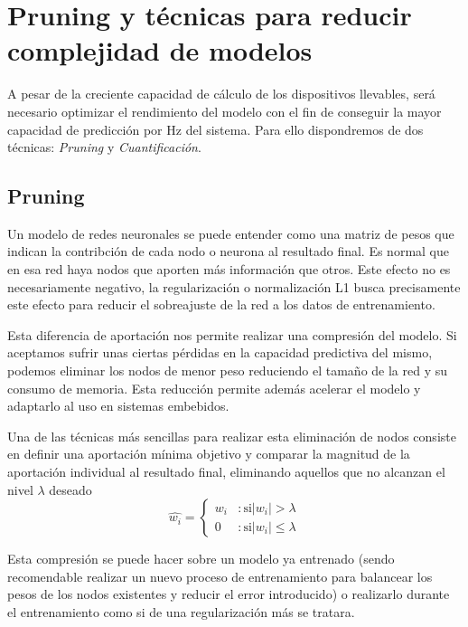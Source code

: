 \documentclass[../tfm.tex]{subfiles}
\begin{document}
\section{Pruning y técnicas para reducir complejidad de modelos}\label{sa_optimizacion}

A pesar de la creciente capacidad de cálculo de los dispositivos llevables, será necesario optimizar el rendimiento del modelo con el fin de conseguir la mayor capacidad de predicción por Hz del sistema. Para ello dispondremos de dos técnicas: \textit{Pruning} y \textit{Cuantificación}.

\subsection{Pruning}
Un modelo de redes neuronales se puede entender como una matriz de pesos que indican la contribción de cada nodo o neurona al resultado final. Es normal que en esa red haya nodos que aporten más información que otros. Este efecto no es necesariamente negativo, la regularización o normalización L1 busca precisamente este efecto para reducir el sobreajuste de la red a los datos de entrenamiento.

Esta diferencia de aportación nos permite realizar una compresión del modelo. Si aceptamos sufrir unas ciertas pérdidas en la capacidad predictiva del mismo, podemos eliminar los nodos de menor peso reduciendo el tamaño de la red y su consumo de memoria. Esta reducción permite además acelerar el modelo y adaptarlo al uso en sistemas embebidos.


Una de las técnicas más sencillas para realizar esta eliminación de nodos consiste en definir una aportación mínima objetivo y comparar la magnitud de la aportación individual al resultado final, eliminando aquellos que no alcanzan el nivel $\lambda$ deseado
\[
\hat{w_i} = \left\{ \begin{matrix} w_i & :\mbox{si} |w_i|>\lambda\\
  0 & :\mbox{si} |w_i|\leq\lambda\end{matrix} \right.
\]

Esta compresión se puede hacer sobre un modelo ya entrenado (sendo recomendable realizar un nuevo proceso de entrenamiento para balancear los pesos de los nodos existentes y reducir el error introducido) o realizarlo durante el entrenamiento como si de una regularización más se tratara.
\end{document}
